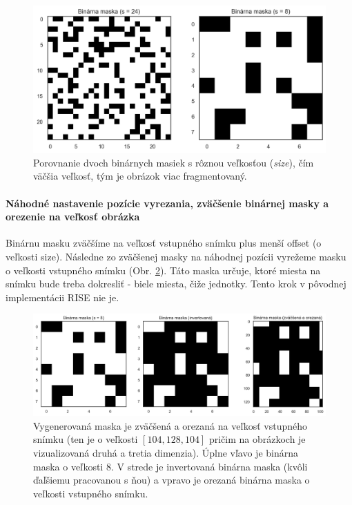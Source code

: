 \begin{figure}[h!]
    \centering
    \includegraphics[width=13cm]{assets/images/binary_mask.png}
    \caption{Porovnanie dvoch binárnych masiek s rôznou veľkosťou (\textit{size}), čím väčšia veľkosť, tým je obrázok viac fragmentovaný.}
    \label{fig:binary_mask}
\end{figure}

\paragraph{Náhodné nastavenie pozície vyrezania, zväčšenie binárnej masky a orezenie na veľkosť obrázka}

Binárnu masku zväčšíme na veľkosť vstupného snímku plus menší offset (o veľkosti size). Následne zo zväčšenej masky na náhodnej pozícii vyrežeme masku o veľkosti vstupného snímku (Obr. \ref{fig:binary_mask_resized}). Táto maska určuje, ktoré miesta na snímku bude treba dokresliť - biele miesta, čiže jednotky. Tento krok v pôvodnej implementácii RISE nie je.

\begin{figure}[h!]
    \centering
    \includegraphics[width=13cm]{assets/images/binary_mask_resized.png}
    \caption{Vygenerovaná maska je zväčšená a orezaná na veľkosť vstupného snímku (ten je o veľkosti $[104, 128, 104]$ pričim na obrázkoch je vizualizovaná druhá a tretia dimenzia). Úplne vľavo je binárna maska o veľkosti $8$. V strede je invertovaná binárna maska (kvôli ďaľšiemu pracovanou s ňou) a vpravo je orezaná binárna maska o veľkosti vstupného snímku.}
    \label{fig:binary_mask_resized}
\end{figure}

